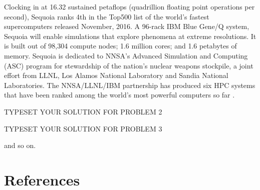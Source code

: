 \documentclass[fleqn,letterpaper,12pt]{report}
\begin{document}
Clocking in at 16.32 sustained petaflops (quadrillion floating point operations per second), Sequoia ranks 4th in the Top500 list of the world's fastest supercomputers released November, 2016. A 96-rack IBM Blue Gene/Q system, Sequoia will enable simulations that explore phenomena at extreme resolutions. It is built out of 98,304 compute nodes; 1.6 million cores; and 1.6 petabytes of memory. Sequoia is dedicated to NNSA's Advanced Simulation and Computing (ASC) program for stewardship of the nation's nuclear weapons stockpile, a joint effort from LLNL, Los Alamos National Laboratory and Sandia National Laboratories. The NNSA/LLNL/IBM partnership has produced six HPC systems that have been ranked among the world's most powerful computers so far \cite{sequoia}. 
\newpage
{}
{}
\problem
TYPESET YOUR SOLUTION FOR PROBLEM 2

%
\newpage
{}
{}
\problem
TYPESET YOUR SOLUTION FOR PROBLEM 3

\vfill
and so on.

\newpage
{}
\section*{References}


\end{document}

